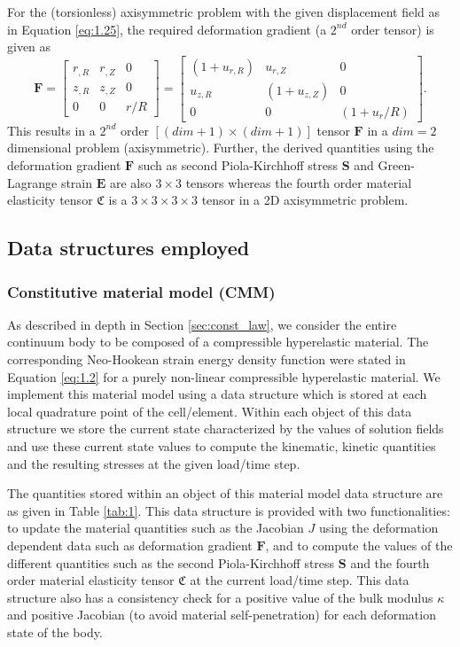 For the (torsionless) axisymmetric problem with the given displacement field as in Equation \eqref{eq:1.25}, the required deformation gradient (a $2^{nd}$ order tensor) is given as \cite{Zienkiewicz2013}
\begin{equation}
\mathbf{F} = \begin{bmatrix}
r_{, R} & r_{, Z} & 0 \\
z_{, R} & z_{, Z} & 0 \\
0 & 0 & r/R
\end{bmatrix} = \begin{bmatrix}
(1 + u_{r, R}) & u_{r, Z} & 0 \\
u_{z, R} & (1 + u_{z, Z}) & 0 \\
0 & 0 & (1 + u_r / R)
\end{bmatrix}.
\label{eq:1.26}
\end{equation}
This results in a $2^{nd}$ order $[(dim + 1) \times (dim + 1)]$ tensor $\mathbf{F}$ in a $dim = 2$ dimensional problem (axisymmetric).  Further, the derived quantities using the deformation gradient $\mathbf{F}$ such as second Piola-Kirchhoff stress $\mathbf{S}$ and Green-Lagrange strain $\mathbf{E}$ are also $3 \times 3$ tensors whereas the fourth order material elasticity tensor $\mathfrak{C}$ is a $3 \times 3 \times 3 \times 3$ tensor in a 2D axisymmetric problem.

\subsection{Data structures employed}
\subsubsection{Constitutive material model (CMM)}
As described in depth in Section \eqref{sec:const_law}, we consider the entire continuum body to be composed of a compressible hyperelastic material. The corresponding Neo-Hookean strain energy density function were stated in Equation \eqref{eq:1.2} for a purely non-linear compressible hyperelastic material. We implement this material model using a data structure which is stored at each local quadrature point of the cell/element. Within each object of this data structure we store the current state characterized by the values of solution fields and use these current state values to compute the kinematic, kinetic quantities and the resulting stresses at the given load/time step.\par 
The quantities stored within an object of this material model data structure are as given in Table \eqref{tab:1}. This data structure is provided with two functionalities: to update the material quantities such as the Jacobian $J$ using the deformation dependent data such as deformation gradient $\mathbf{F}$, and to compute the values of the different quantities such as the second Piola-Kirchhoff stress $\mathbf{S}$ and the fourth order material elasticity tensor $\mathfrak{C}$ at the current load/time step. This data structure also has a consistency check for a positive value of the bulk modulus $\kappa$ and positive Jacobian (to avoid material self-penetration) for each deformation state of the body. \par 

